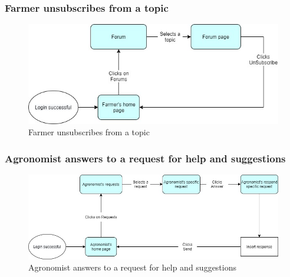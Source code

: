 \documentclass{article}
\begin{document}
        
        \subsubsection{Farmer unsubscribes from a topic}
            \begin{figure} [h]
                \centering
                \includegraphics[width=1\textwidth]{images/UserInterfaces/MapsFunctionalities/11. FarmerUnsubscribesFromTopic.jpg}
                \caption{\label{fig:FarmerUnSubscribesTopic}Farmer unsubscribes from a topic}
            \end{figure}
        
        
        
        
    
        \newpage
        
        
        
        \subsubsection{Agronomist answers to a request for help and suggestions}
            \begin{figure} [h]
                \centering
                \includegraphics[width=1\textwidth]{images/UserInterfaces/MapsFunctionalities/14. AgronomistAnswersToRequestHelpAndSuggestions.jpg}
                \caption{\label{fig:AgronomistAnswerHelp}Agronomist answers to a request for help and suggestions}
            \end{figure}
    
\end{document}
